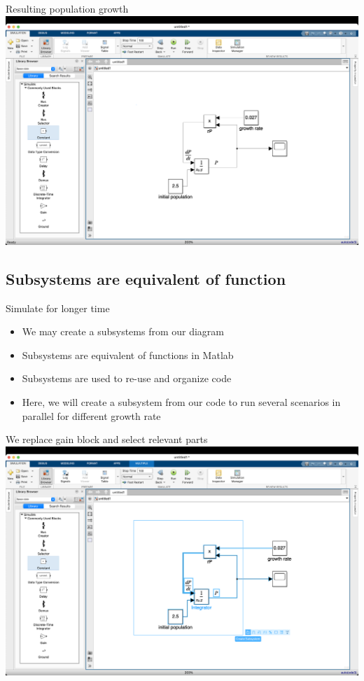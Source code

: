 \begin{frame}{Resulting population growth}
    \hspace*{-11mm}
    \includegraphics[width=\paperwidth]{lesson_2/images/simulink_screen_27.png}
\end{frame}

\subsection{Subsystems are equivalent of function}
\begin{frame}{Simulate for longer time}
\Large
\begin{itemize}
    \item We may create a subsystems from our diagram
    \item Subsystems are equivalent of functions in Matlab
    \item Subsystems are used to re-use and organize code
    \pause
    \item Here, we will create a subsystem from our code to run several scenarios in parallel for different growth rate
\end{itemize}
\end{frame}

\begin{frame}{We replace gain block and select relevant parts}
    \hspace*{-11mm}
    \includegraphics[width=\paperwidth]{lesson_2/images/simulink_screen_28.png}
\end{frame}

